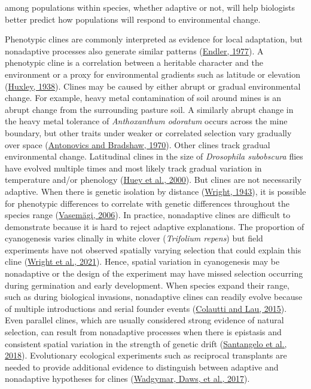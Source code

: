 \documentclass[
  12pt,
]{article}
\begin{document}
among populations within species, whether adaptive or not, will help biologists better predict how populations will respond to environmental change.

Phenotypic clines are commonly interpreted as evidence for local adaptation, but nonadaptive processes also generate similar patterns (\protect\hyperlink{ref-endler_geographic_1977}{Endler, 1977}). A phenotypic cline is a correlation between a heritable character and the environment or a proxy for environmental gradients such as latitude or elevation (\protect\hyperlink{ref-huxley_clines_1938}{Huxley, 1938}). Clines may be caused by either abrupt or gradual environmental change. For example, heavy metal contamination of soil around mines is an abrupt change from the surrounding pasture soil. A similarly abrupt change in the heavy metal tolerance of \emph{Anthoxanthum odoratum} occurs across the mine boundary, but other traits under weaker or correlated selection vary gradually over space (\protect\hyperlink{ref-antonovics_evolution_1970}{Antonovics and Bradshaw, 1970}). Other clines track gradual environmental change. Latitudinal clines in the size of \emph{Drosophila subobscura} flies have evolved multiple times and most likely track gradual variation in temperature and/or phenology (\protect\hyperlink{ref-huey_rapid_2000}{Huey et al., 2000}). But clines are not necessarily adaptive. When there is genetic isolation by distance (\protect\hyperlink{ref-wright_isolation_1943}{Wright, 1943}), it is possible for phenotypic differences to correlate with genetic differences throughout the species range (\protect\hyperlink{ref-vasemagi_adaptive_2006}{Vasemägi, 2006}). In practice, nonadaptive clines are difficult to demonstrate because it is hard to reject adaptive explanations. The proportion of cyanogenesis varies clinally in white clover (\emph{Trifolium repens}) but field experiments have not observed spatially varying selection that could explain this cline (\protect\hyperlink{ref-wright_genetic_2021}{Wright et al., 2021}). Hence, spatial variation in cyanogenesis may be nonadaptive or the design of the experiment may have missed selection occurring during germination and early development. When species expand their range, such as during biological invasions, nonadaptive clines can readily evolve because of multiple introductions and serial founder events (\protect\hyperlink{ref-colautti_contemporary_2015}{Colautti and Lau, 2015}). Even parallel clines, which are usually considered strong evidence of natural selection, can result from nonadaptive processes when there is epistasis and consistent spatial variation in the strength of genetic drift (\protect\hyperlink{ref-santangelo_modern_2018}{Santangelo et al., 2018}). Evolutionary ecological experiments such as reciprocal transplants are needed to provide additional evidence to distinguish between adaptive and nonadaptive hypotheses for clines (\protect\hyperlink{ref-wadgymar_integrating_2017}{Wadgymar, Daws, et al., 2017}).
\end{document}
